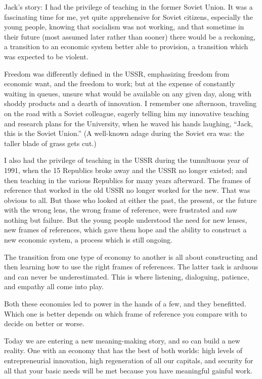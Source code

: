 \begin{longstoryblock}
Jack’s story: I had the privilege of teaching in the former Soviet Union. It was a fascinating time for me, yet quite apprehensive for Soviet citizens, especially the young people, knowing that socialism was not working, and that sometime in their future (most assumed later rather than sooner) there would be a reckoning, a transition to an economic system better able to provision, a transition which was expected to be violent. 


Freedom was differently defined in the USSR, emphasizing freedom from economic want, and the freedom to work; but at the expense of constantly waiting in queues, unsure what would be available on any given day, along with shoddy products and a dearth of innovation. I remember one afternoon, traveling on the road with a Soviet colleague, eagerly telling him my innovative teaching and research plans for the University, when he waved his hands laughing, “Jack, this is the Soviet Union.” (A well-known adage during the Soviet era was: the taller blade of grass gets cut.)


I also had the privilege of teaching in the USSR during the tumultuous year of 1991, when the 15 Republics broke away and the USSR no longer existed; and then teaching in the various Republics for many years afterward. The frames of reference that worked in the old USSR no longer worked for the new. That was obvious to all. But those who looked at either the past, the present, or the future with the wrong lens, the wrong frame of reference, were frustrated and saw nothing but failure. But the young people understood the need for new lenses, new frames of references, which gave them hope and the ability to construct a new economic system, a process which is still ongoing. 


The transition from one type of economy to another is all about constructing and then learning how to use the right frames of references. The latter task is arduous and can never be underestimated. This is where listening, dialoguing, patience, and empathy all come into play. 
\end{longstoryblock}


Both these economies led to power in the hands of a few, and they benefitted. Which one is better depends on which frame of reference you compare with to decide on better or worse.


Today we are entering a new meaning\hyp{}making story, and so can build a new reality. One with an economy that has the best of both worlds: high levels of entrepreneurial innovation, high regeneration of all our capitals, and security for all that your basic needs will be met because you have meaningful gainful work. 


